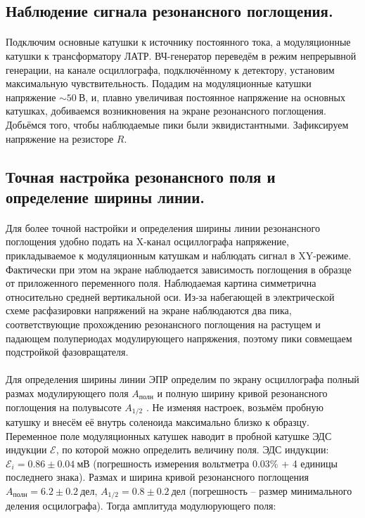 \documentclass[a4paper,12pt]{article} %
\begin{document}
\subsection{Наблюдение сигнала резонансного поглощения.}
\paragraph{}Подключим основные катушки к источнику постоянного тока, а модуляционные катушки к трансформатору ЛАТР. ВЧ-генератор переведём в режим непрерывной генерации, на канале осциллографа, подключённому к детектору, установим максимальную чувствительность. Подадим на модуляционные катушки напряжение $\sim 50~\text{В}$, и, плавно увеличивая постоянное напряжение на основных катушках, добиваемся возникновения на экране резонансного поглощения. Добьёмся того, чтобы наблюдаемые пики были эквидистантными. Зафиксируем напряжение на резисторе $R$.

\subsection*{Точная настройка резонансного поля и определение ширины линии.}
\paragraph{}Для более точной настройки и определения ширины линии резонансного поглощения удобно подать на X-канал осциллографа напряжение, прикладываемое к модуляционным катушкам и наблюдать сигнал в XY-режиме. Фактически при этом на экране наблюдается зависимость поглощения в образце от приложенного переменного поля. Наблюдаемая картина симметрична относительно средней вертикальной оси. Из-за набегающей в электрической схеме расфазировки напряжений на экране наблюдаются два пика, соответствующие прохождению резонансного поглощения на растущем и падающем полупериодах модулирующего напряжения, поэтому пики совмещаем подстройкой фазовращателя.

\paragraph{}Для определения ширины линии ЭПР определим по экрану осциллографа полный размах
модулирующего поля $A_{\text{полн}}$ и полную ширину кривой резонансного
поглощения на полувысоте $A_{\text{1/2}}$ . Не изменяя настроек, возьмём пробную катушку и внесём её внутрь соленоида максимально близко к образцу. Переменное поле модуляционных катушек наводит в пробной катушке ЭДС индукции $\mathcal{E}$, по которой можно определить величину поля. ЭДС индукции: $\mathcal{E}_i = 0.86\pm 0.04~\text{мВ}$ (погрешность измерения вольтметра 0.03\% + 4 единицы последнего знака). Размах и ширина кривой резонансного поглощения $A_{\text{полн}} = 6.2 \pm 0.2~\text{дел}$, $A_{\text{1/2}} = 0.8 \pm 0.2~\text{дел}$ (погрешность -- размер минимального деления осцилографа). Тогда амплитуда модулюрующего поля:
\end{document}
